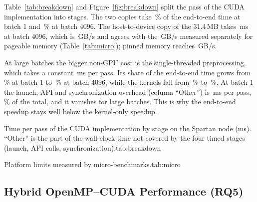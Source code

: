 Table~\ref{tab:breakdown} and Figure~\ref{fig:breakdown} split the pass of the CUDA implementation into stages. The two copies take \,\% of the end-to-end time at batch 1 and \,\% at batch 4096. The host-to-device copy of the 31.4\,MB takes \,ms at batch 4096, which is \,GB/s and agrees with the \,GB/s measured separately for pageable memory (Table~\ref{tab:micro}); pinned memory reaches \,GB/s.

At large batches the bigger non-GPU cost is the single-threaded preprocessing, which takes a constant \,ms per pass. Its share of the end-to-end time grows from \,\% at batch 1 to \,\% at batch 4096, while the kernels fall from \,\% to \,\%. At batch 1 the launch, API and synchronization overhead (column ``Other'') is \,ms per pass, \,\% of the total, and it vanishes for large batches. This is why the end-to-end speedup stays well below the kernel-only speedup.


\begin{widetable}{Time per pass of the CUDA implementation by stage on the Spartan node (ms). ``Other'' is the part of the wall-clock time not covered by the four timed stages (launch, API calls, synchronization).}{tab:breakdown}

\end{widetable}

\begin{coltable}{Platform limits measured by micro-benchmarks.}{tab:micro}

\end{coltable}

\subsection{Hybrid OpenMP--CUDA Performance (RQ5)}\label{sec:hybrid}

